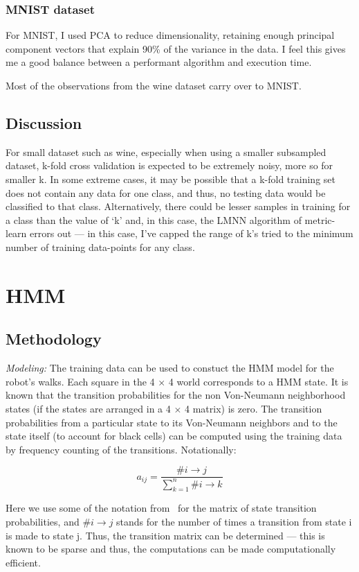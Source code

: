\documentclass[5pt]{article}
\begin{document}
\subsubsection{MNIST dataset}
For MNIST, I used PCA to reduce dimensionality, retaining enough principal
component vectors that explain 90\% of the variance in the data. I feel this
gives me a good balance between a performant algorithm and execution time.

Most of the observations from the wine dataset carry over to MNIST\@.

\subsection{Discussion}
For small dataset such as wine, especially when using a smaller subsampled
dataset, k-fold cross validation is expected to be extremely noisy, more so for
smaller k. In some extreme cases, it may be possible that a k-fold training set
does not contain any data for one class, and thus, no testing data would be
classified to that class. Alternatively, there could be lesser samples in
training for a class than the value of `k' and, in this case, the LMNN
algorithm of metric-learn errors out --- in this case, I've capped the range
of k's tried to the minimum number of training data-points for any class.

\section{HMM}
\subsection{Methodology}
\emph{Modeling:} The training data can be used to constuct the HMM model for
the robot's walks.  Each square in the 4 $\times$ 4 world corresponds to a HMM
state. It is known that the transition probabilities for the non Von-Neumann
neighborhood states (if the states are arranged in a 4 $\times$ 4 matrix) is
zero. The transition probabilities from a particular state to its Von-Neumann
neighbors and to the state itself (to account for black cells) can be computed
using the training data by frequency counting of the transitions. Notationally:

\begin{equation}
a_{ij} = \frac{\#i \rightarrow j}{\sum_{k=1}^{n}\#i \rightarrow k}
\end{equation}

Here we use some of the notation from~\cite{rabiner1989tutorial} for the matrix
of state transition probabilities, and $\#i \rightarrow j$ stands for the
number of times a transition from state i is made to state j. Thus, the
transition matrix can be determined --- this is known to be sparse and thus,
the computations can be made computationally efficient.
\end{document}
